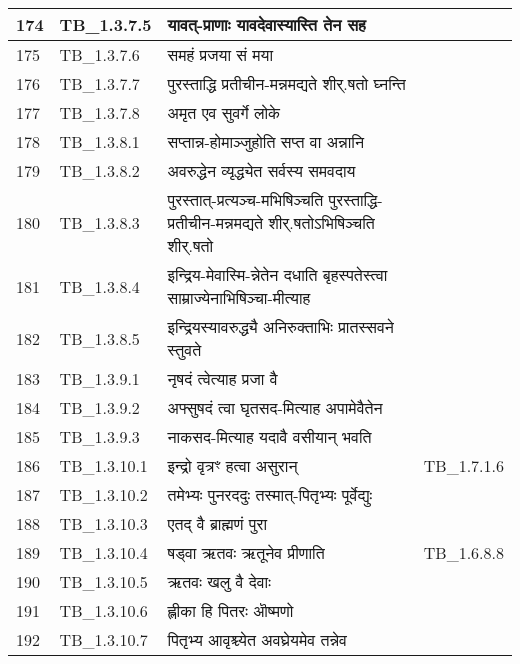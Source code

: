\documentclass[17pt]{extarticle}
\begin{document}
\begin{longtable}{||p{0.4in}||p{0.9in}||p{4.0in}||p{0.9in}||}
        \hline
            174 & TB\_1.3.7.5 & यावत्{-}प्राणाः यावदेवास्यास्ति तेन सह &      \\
        \hline
            175 & TB\_1.3.7.6 & समहं प्रजया सं मया &      \\
        \hline
            176 & TB\_1.3.7.7 & पुरस्ताद्धि प्रतीचीन{-}मन्नमद्यते शीर्.षतो घ्नन्ति &      \\
        \hline
            177 & TB\_1.3.7.8 & अमृत एव सुवर्गे लोके &      \\
        \hline
            178 & TB\_1.3.8.1 & सप्तान्न{-}होमाञ्जुहोति सप्त वा अन्नानि &      \\
        \hline
            179 & TB\_1.3.8.2 & अवरुद्धेन व्यृद्ध्येत सर्वस्य समवदाय &      \\
        \hline
            180 & TB\_1.3.8.3 & पुरस्तात्{-}प्रत्यञ्च{-}मभिषिञ्चति पुरस्ताद्धि{-}प्रतीचीन{-}मन्नमद्यते शीर्.षतोऽभिषिञ्चति शीर्.षतो &      \\
        \hline
            181 & TB\_1.3.8.4 & इन्द्रिय{-}मेवास्मि{-}न्नेतेन दधाति बृहस्पतेस्त्वा साम्राज्येनाभिषिञ्चा{-}मीत्याह &      \\
        \hline
            182 & TB\_1.3.8.5 & इन्द्रियस्यावरुद्ध्यै अनिरुक्ताभिः प्रातस्सवने स्तुवते &      \\
        \hline
            183 & TB\_1.3.9.1 & नृषदं त्वेत्याह प्रजा वै &      \\
        \hline
            184 & TB\_1.3.9.2 & अफ्सुषदं त्वा घृतसद{-}मित्याह अपामेवैतेन &      \\
        \hline
            185 & TB\_1.3.9.3 & नाकसद{-}मित्याह यदावै वसीयान् भवति &      \\
        \hline
            186 & TB\_1.3.10.1 & इन्द्रो वृत्रꣳ हत्वा असुरान् &  TB\_1.7.1.6       \\
        \hline
            187 & TB\_1.3.10.2 & तमेभ्यः पुनरददुः तस्मात्{-}पितृभ्यः पूर्वेद्युः &      \\
        \hline
            188 & TB\_1.3.10.3 & एतद् वै ब्राह्मणं पुरा &      \\
        \hline
            189 & TB\_1.3.10.4 & षड्वा ऋतवः ऋतूनेव प्रीणाति &  TB\_1.6.8.8       \\
        \hline
            190 & TB\_1.3.10.5 & ऋतवः खलु वै देवाः &      \\
        \hline
            191 & TB\_1.3.10.6 & ह्लीका हि पितरः ऒष्मणो &      \\
        \hline
            192 & TB\_1.3.10.7 & पितृभ्य आवृश्च्येत अवघ्रेयमेव तन्नेव &      \\

\end{longtable}
\end{document}
